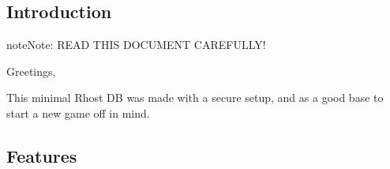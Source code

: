 \documentclass[letterpaper,10pt,english]{sphinxmanual}
\begin{document}
\subsection{Introduction}
\label{\detokenize{gettingstarted:introduction}}
\begin{sphinxadmonition}{note}{Note:}
\sphinxAtStartPar
READ THIS DOCUMENT CAREFULLY!
\end{sphinxadmonition}

\sphinxAtStartPar
Greetings,

\sphinxAtStartPar
This minimal Rhost DB was made with a secure setup, and as a good base to start
a new game off in mind.


\subsection{Features}
\label{\detokenize{gettingstarted:features}}
\end{document}
